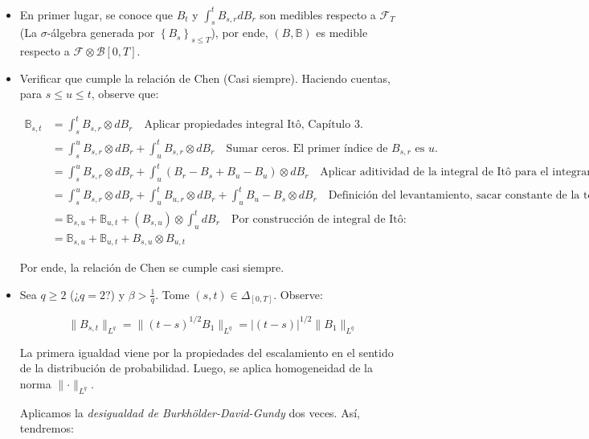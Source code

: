 \begin{itemize}

	\item En primer lugar, se conoce que $B_t$ y $\int_s^t B_{s,r} dB_r$ son medibles respecto a $\mathcal{F}_T$ (La $\sigma$-álgebra generada por $\left\{ B_s \right\}_{s \leq T}$), por ende, $(B, \mathbb{B})$ es medible respecto a $\mathcal{F} \otimes \mathcal{B}[0,T]$.

	\item Verificar que cumple la relación de Chen (Casi siempre). Haciendo cuentas, para $s \leq u \leq t$, observe que:

	\begin{align*}
		\mathbb{B}_{s,t} &= \int_s^t B_{s,r} \otimes dB_r \quad \text{Aplicar propiedades integral Itô, Capítulo 3.} \\
		&= \int_s^u B_{s,r} \otimes dB_r + \int_u^t B_{s,r} \otimes dB_r \quad \text{Sumar ceros. El primer índice de } B_{s,r} \text{ es } u. \\
		&= \int_s^u B_{s,r} \otimes dB_r + \int_u^t \left( B_r - B_s + B_u - B_u \right) \otimes dB_r \quad \text{Aplicar aditividad de la integral de Itô para el integrando} \\
		&= \int_s^u B_{s,r} \otimes dB_r + \int_u^t  B_{u,r} \otimes dB_r + \int_u^t B_u - B_s \otimes dB_r \quad \text{Definición del levantamiento, sacar constante de la tercera integral}  \\
		&= \mathbb{B}_{s,u} + \mathbb{B}_{u,t} + (B_{s,u}) \otimes \int_u^t dB_r \quad \text{Por construcción de integral de Itô:} \\
		&= \mathbb{B}_{s,u} + \mathbb{B}_{u,t} + B_{s,u} \otimes B_{u,t}
	\end{align*} 

	Por ende, la relación de Chen se cumple casi siempre.

	\item Sea $q \geq 2$ (¿$q = 2$?) y $\beta > \frac{1}{q}$. Tome $(s,t) \in \Delta_{[0,T]}$. Observe:

	\[
		\lVert B_{s,t} \rVert_{L^q} = \lVert (t-s)^{1/2} B_1 \rVert_{L^q} = \lvert (t-s) \rvert^{1/2} \lVert B_1 \rVert_{L^q}
	\]

	La primera igualdad viene por la propiedades del escalamiento en el sentido de la distribución de probabilidad. Luego, se aplica homogeneidad de la norma $\lVert \cdot \rVert_{L^q}$.

	Aplicamos la \textit{desigualdad de Burkhölder-David-Gundy} dos veces. Así, tendremos:


\end{itemize}
